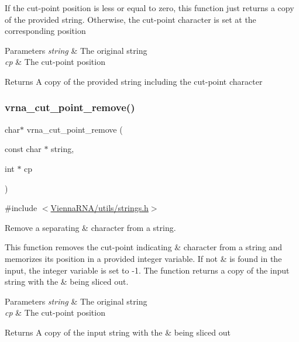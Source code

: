 If the cut-\/point position is less or equal to zero, this function just returns a copy of the provided string. Otherwise, the cut-\/point character is set at the corresponding position


\begin{DoxyParams}{Parameters}
{\em string} & The original string \\
\hline
{\em cp} & The cut-\/point position \\
\hline
\end{DoxyParams}
\begin{DoxyReturn}{Returns}
A copy of the provided string including the cut-\/point character 
\end{DoxyReturn}
\mbox{\label{group__string__utils_ga1fbd821d4408cc5f1dd9d12c15e092cb}} 
\subsubsection{\texorpdfstring{vrna\_cut\_point\_remove()}{vrna\_cut\_point\_remove()}}
{\footnotesize\ttfamily char$\ast$ vrna\+\_\+cut\+\_\+point\+\_\+remove (\begin{DoxyParamCaption}\item[{const char $\ast$}]{string,  }\item[{int $\ast$}]{cp }\end{DoxyParamCaption})}



{\ttfamily \#include $<$\mbox{\hyperlink{strings_8h}{Vienna\+R\+N\+A/utils/strings.\+h}}$>$}



Remove a separating \textquotesingle{}\&\textquotesingle{} character from a string. 

This function removes the cut-\/point indicating \textquotesingle{}\&\textquotesingle{} character from a string and memorizes its position in a provided integer variable. If not \textquotesingle{}\&\textquotesingle{} is found in the input, the integer variable is set to -\/1. The function returns a copy of the input string with the \textquotesingle{}\&\textquotesingle{} being sliced out.


\begin{DoxyParams}{Parameters}
{\em string} & The original string \\
\hline
{\em cp} & The cut-\/point position \\
\hline
\end{DoxyParams}
\begin{DoxyReturn}{Returns}
A copy of the input string with the \textquotesingle{}\&\textquotesingle{} being sliced out 
\end{DoxyReturn}
